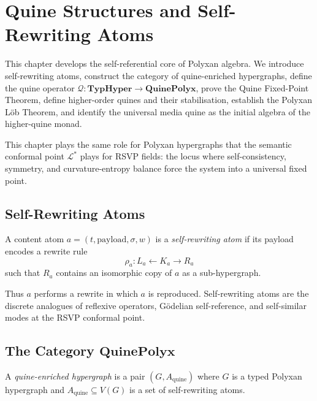 \chapter{Quine Structures and Self-Rewriting Atoms}
\label{ch:quines}

This chapter develops the self-referential core of Polyxan algebra.  
We introduce self-rewriting atoms, construct the category of
quine-enriched hypergraphs, define the quine operator 
$\mathcal{Q}:\mathbf{TypHyper}\to\mathbf{QuinePolyx}$,
prove the Quine Fixed-Point Theorem, define higher-order quines and their
stabilisation, establish the Polyxan Löb Theorem, and identify the universal
media quine as the initial algebra of the higher-quine monad.

This chapter plays the same role for Polyxan hypergraphs that the
semantic conformal point $\mathcal{L}^{\ast}$ plays for RSVP fields:  
the locus where self-consistency, symmetry, and curvature-entropy balance
force the system into a universal fixed point.

\section{Self-Rewriting Atoms}

\begin{definition}
A content atom $a=(t,\mathrm{payload},\sigma,w)$ is a 
\emph{self-rewriting atom} if its payload encodes a rewrite rule
\[
\rho_a : L_a \longleftarrow K_a \longrightarrow R_a
\]
such that $R_a$ contains an isomorphic copy of $a$ as a sub-hypergraph.
\end{definition}

Thus $a$ performs a rewrite in which $a$ is reproduced.  
Self-rewriting atoms are the discrete analogues of reflexive operators,
Gödelian self-reference, and self-similar modes at the RSVP conformal point.

\section{The Category \texorpdfstring{$\mathbf{QuinePolyx}$}{QuinePolyx}}

\begin{definition}
A \emph{quine-enriched hypergraph} is a pair $(G,A_{\mathrm{quine}})$ where  
$G$ is a typed Polyxan hypergraph and   
$A_{\mathrm{quine}} \subseteq V(G)$ is a set of self-rewriting atoms.
\end{definition}

